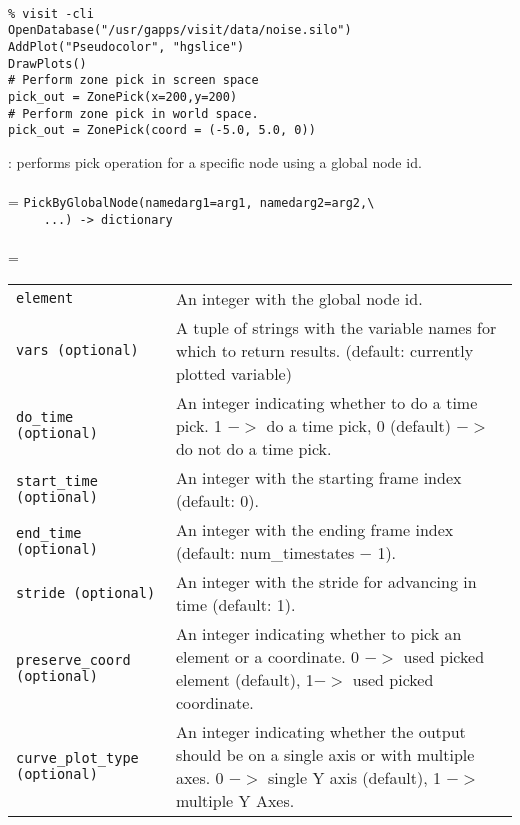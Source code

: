 \documentclass[10pt,a4paper]{report}
\begin{document}
\\[-6mm]
\begin{verbatim}% visit -cli
OpenDatabase("/usr/gapps/visit/data/noise.silo")
AddPlot("Pseudocolor", "hgslice")
DrawPlots()
# Perform zone pick in screen space
pick_out = ZonePick(x=200,y=200)
# Perform zone pick in world space.
pick_out = ZonePick(coord = (-5.0, 5.0, 0))
\end{verbatim}
\newpage


{}
: performs pick operation for a specific node using a global node id.\\[-3mm]

 \\ 
\hangindent=\parindent
\verb!PickByGlobalNode(namedarg1=arg1, namedarg2=arg2,\ ! \\ 
\verb!     ...) -> dictionary!\\ [-3mm]

 \\ 
\hangindent=\parindent 
\begin{tabular}{lp{9cm}}
\verb!element! & An integer with the global node id. \\
\verb!vars (optional)! & A tuple of strings with the variable names for which to return results. (default: currently plotted variable) \\
\verb!do_time (optional)! & An integer indicating whether to do a time pick. 1 $-$$>$ do a time pick, 0 (default) $-$$>$ do not do a time pick. \\
\verb!start_time (optional)! & An integer with the starting frame index (default: 0). \\
\verb!end_time (optional)! & An integer with the ending frame index (default: num\_timestates $-$ 1). \\
\verb!stride (optional)! & An integer with the stride for advancing in time (default: 1). \\
\verb!preserve_coord (optional)! & An integer indicating whether to pick an element or a coordinate. 0 $-$$>$ used picked element (default), 1$-$$>$ used picked coordinate. \\
\verb!curve_plot_type (optional)! & An integer indicating whether the output should be on a single axis or with multiple axes. 0 $-$$>$ single Y axis (default), 1 $-$$>$ multiple Y Axes. \\
\end{tabular} \\[-2mm]
\end{document}
